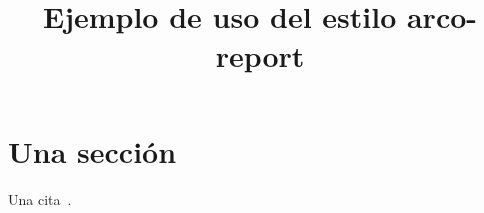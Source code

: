\documentclass{arco-report}
\title{Ejemplo de uso del estilo arco-report}
\begin{document}
\maketitle

\section{Una sección}



Una cita~\cite{Cannon}.


\end{document}
